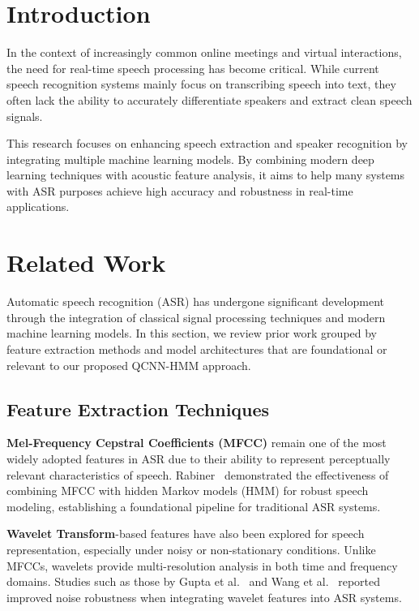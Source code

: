 \documentclass[conference]{IEEEtran}
\begin{document}
\section{Introduction}
In the context of increasingly common online meetings and virtual interactions,
the need for real-time speech processing has become critical.
While current speech recognition systems mainly focus on transcribing speech into text,
they often lack the ability to accurately differentiate speakers and extract clean speech signals.

This research focuses on enhancing speech extraction and speaker recognition by
integrating multiple machine learning models. By combining modern deep learning
techniques with acoustic feature analysis, it aims to help many systems with ASR
purposes achieve high accuracy and robustness in real-time applications.
\section{Related Work}

Automatic speech recognition (ASR) has undergone significant development through the integration of classical signal processing techniques and modern machine learning models. In this section, we review prior work grouped by feature extraction methods and model architectures that are foundational or relevant to our proposed QCNN-HMM approach.

\subsection{Feature Extraction Techniques}

\textbf{Mel-Frequency Cepstral Coefficients (MFCC)} remain one of the most widely adopted features in ASR due to their ability to represent perceptually relevant characteristics of speech. Rabiner~\cite{rabiner1989tutorial} demonstrated the effectiveness of combining MFCC with hidden Markov models (HMM) for robust speech modeling, establishing a foundational pipeline for traditional ASR systems.

\textbf{Wavelet Transform}-based features have also been explored for speech representation, especially under noisy or non-stationary conditions. Unlike MFCCs, wavelets provide multi-resolution analysis in both time and frequency domains. Studies such as those by Gupta et al.~\cite{gupta2003robust} and Wang et al.~\cite{wang2008robust} reported improved noise robustness when integrating wavelet features into ASR systems.
\end{document}
